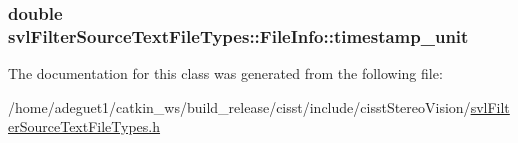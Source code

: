 \hypertarget{classsvl_filter_source_text_file_types_1_1_file_info_aa6d0b04ba4092e788a532c3d88a0420e}{
\subsubsection[{timestamp\-\_\-unit}]{\setlength{\rightskip}{0pt plus 5cm}double svl\-Filter\-Source\-Text\-File\-Types\-::\-File\-Info\-::timestamp\-\_\-unit}}\label{classsvl_filter_source_text_file_types_1_1_file_info_aa6d0b04ba4092e788a532c3d88a0420e}


The documentation for this class was generated from the following file\-:\begin{DoxyCompactItemize}
\item 
/home/adeguet1/catkin\-\_\-ws/build\-\_\-release/cisst/include/cisst\-Stereo\-Vision/\hyperlink{svl_filter_source_text_file_types_8h}{svl\-Filter\-Source\-Text\-File\-Types.\-h}\end{DoxyCompactItemize}
